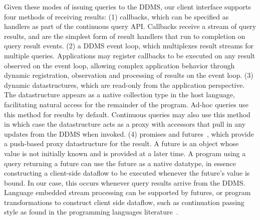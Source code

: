 Given these modes of issuing queries to the DDMS, our client interface supports
four methods of receiving results:
(1) callbacks, which can be specified as handlers as part of the continuous query
API. Callbacks receive a stream of query results, and are the simplest form of
result handlers that run to completion on query result events.  
(2) a DDMS event loop, which multiplexes result streams for multiple queries.
Applications may register callbacks to be executed on any result observed on the
event loop, allowing complex application behavior through dynamic
registration, observation and processing of results on the event loop.
(3) dynamic datastructures, which are read-only from the application
perspective. The datastructure appears as a native collection type in the host
language, facilitating natural access for the remainder of the program. Ad-hoc
queries use this method for results by default. Continuous queries may also use
this method in which case the datastructure acts as a proxy with accessors that
pull in any updates from the DDMS when invoked.
(4) promises and futures~\cite{Liskov:1988:PLS:53990.54016}, which provide a
push-based proxy datastructure for the
result. A future is an object whose value is not initially known and is provided
at a later time. A program using a query returning a future can use the future
as a native datatype, in essence constructing a client-side dataflow to be
executed whenever the future's value is bound. In our case, this occurs whenever
query results arrive from the DDMS. Language embedded stream processing can be
supported by futures, or program transformations to construct client side
dataflow, such as continuation passing style as found in the programming languages
literature~\cite{sussman-hsc:98}.




